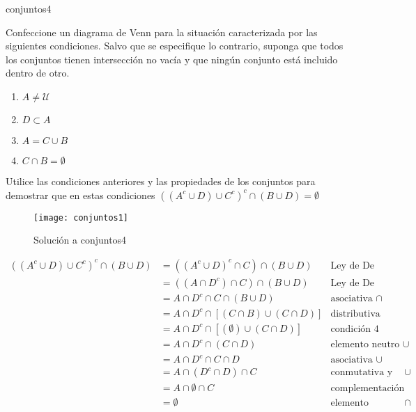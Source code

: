 \begin{defproblem}{conjuntos4}%
	\begin{onlyproblem}%
		Confeccione un diagrama de Venn para la situación caracterizada por las siguientes condiciones. Salvo que se especifique lo contrario, suponga que todos los conjuntos tienen intersección no vacía y que ningún conjunto está incluido dentro de otro.
		
		\begin{enumerate}
			\item $ A \neq \mathcal{U} $
			\item $ D \subset A $
			\item $ A = C \cup B $
			\item $ C \cap B = \emptyset $
		\end{enumerate}
		
		Utilice las condiciones anteriores y las propiedades de los conjuntos para demostrar que en estas condiciones $ ((A^c \cup D) \cup C^c)^c \cap (B \cup D) = \emptyset $
	\end{onlyproblem}%
	\begin{onlysolution}%
		
		\begin{figure}
			\texttt{[image: conjuntos1]}
			\caption[Solución a conjuntos4]{Solución a conjuntos4}
			\label{fig:conjuntos4-solucion}
		\end{figure}
	
		\begin{align*}
		((A^c \cup D) \cup C^c)^c \cap (B \cup D) & = ((A^c \cup D)^c \cap C) \cap (B \cup D) & \text{Ley de De Morgan y doble complemento} \\	
		& = ((A \cap D^c) \cap C) \cap (B \cup D) & \text{Ley de De Morgan y doble complemento} \\
		& = A \cap D^c \cap C \cap (B \cup D) & \text{asociativa } \cap \\
		& = A \cap D^c \cap [(C \cap B) \cup (C \cap D)] & \text{distributiva } \\
		& = A \cap D^c \cap [(\emptyset) \cup (C \cap D)] & \text{condición }4 \\
		& = A \cap D^c \cap (C \cap D) & \text{elemento neutro }\cup \\
		& = A \cap D^c \cap C \cap D & \text{asociativa }\cup \\
		& = A \cap (D^c \cap D) \cap C & \text{conmutativa y asociativa }\cup \\
		& = A \cap \emptyset \cap C & \text{complementación} \\
		& = \emptyset & \text{elemento absorbente }\cap
		\end{align*}
	\end{onlysolution}%
\end{defproblem}